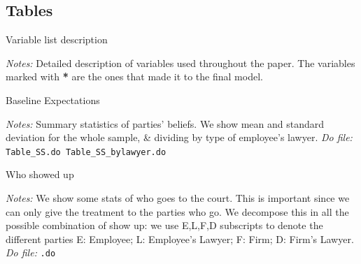 \documentclass[11pt]{article}
\begin{document}
\subsection{Tables}



\begin{table}[H]
    \caption{Variable list description }
    \label{tab:SS}
    \begin{center}
        \scriptsize{}
    \end{center}
    \footnotesize
    \textit{Notes:} 
Detailed description of variables used throughout the paper. The variables marked with \textbf{*} are the ones that made it to the final model.
\end{table}


\begin{table}[H]
    \caption{Baseline Expectations}
    \label{Table_expectations}
    \begin{center}
       \scriptsize{}
    \end{center}
    \footnotesize    
    \textit{Notes:} 
    Summary statistics of parties' beliefs. We show mean and standard deviation for the whole sample, \& dividing by type of employee's lawyer.
    \textit{Do file: } \texttt{Table\_SS.do  Table\_SS\_bylawyer.do}
\end{table}



\begin{table}[H]
    \caption{Who showed up }
    \label{whoshowedup}
    \begin{center}
        \scriptsize{}
    \end{center}
    \footnotesize
    \textit{Notes:} 
We show some stats of who goes to the court. This is important since we can only give the treatment to the parties who go.  We decompose this in all the possible combination of show up: we use E,L,F,D subscripts to denote the different parties E: Employee; L: Employee’s Lawyer;  F: Firm; D: Firm’s Lawyer.
    \textit{Do file: } \texttt{.do}
\end{table}
\end{document}
